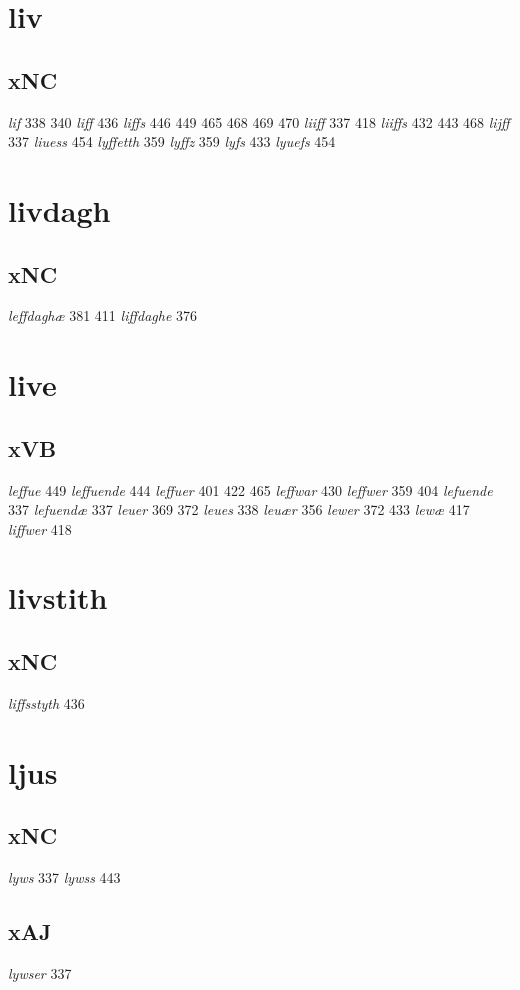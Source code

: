 \documentclass[a4paper,twocolumn]{article}
\begin{document}
\section{liv}
\label{sec:orgb7255a0}
\subsection{xNC}
\label{sec:orgc8b223c}
\emph{lif} 338 340 \emph{liff} 436 \emph{liffs} 446 449 465 468 469 470 \emph{liiff} 337 418 \emph{liiffs} 432 443 468 \emph{lijff} 337 \emph{liuess} 454 \emph{lyffetth} 359 \emph{lyffz} 359 \emph{lyfs} 433 \emph{lyuefs} 454 
\section{livdagh}
\label{sec:orga6430dd}
\subsection{xNC}
\label{sec:org71a0eaf}
\emph{leffdaghæ} 381 411 \emph{liffdaghe} 376 
\section{live}
\label{sec:orge702302}
\subsection{xVB}
\label{sec:org87dbd1f}
\emph{leffue} 449 \emph{leffuende} 444 \emph{leffuer} 401 422 465 \emph{leffwar} 430 \emph{leffwer} 359 404 \emph{lefuende} 337 \emph{lefuendæ} 337 \emph{leuer} 369 372 \emph{leues} 338 \emph{leuær} 356 \emph{lewer} 372 433 \emph{lewæ} 417 \emph{liffwer} 418 
\section{livstith}
\label{sec:orge422bb9}
\subsection{xNC}
\label{sec:org8acc721}
\emph{liffsstyth} 436 
\section{ljus}
\label{sec:orgecd4caf}
\subsection{xNC}
\label{sec:orgf8cc992}
\emph{lyws} 337 \emph{lywss} 443 
\subsection{xAJ}
\label{sec:orge370c75}
\emph{lywser} 337 
\end{document}
